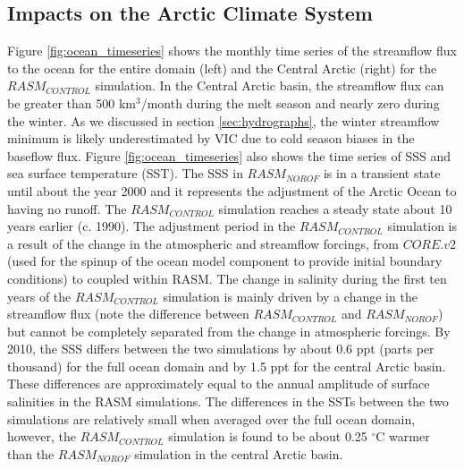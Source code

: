 \documentclass[jgrga, draft]{agutex}
\begin{document}
\begin{article}
\subsection{Impacts on the Arctic Climate System}
\label{sec:ocean}
Figure \ref{fig:ocean_timeseries} shows the monthly time series of the streamflow flux to the ocean for the entire domain (left) and the Central Arctic (right) for the $RASM_{CONTROL}$ simulation.
In the Central Arctic basin, the streamflow flux can be greater than 500 km$^3$/month during the melt season and nearly zero during the winter.
As we discussed in section \ref{sec:hydrographs}, the winter streamflow minimum is likely underestimated by VIC due to cold season biases in the baseflow flux.
Figure \ref{fig:ocean_timeseries} also shows the time series of SSS and sea surface temperature (SST).
The SSS in $RASM_{NOROF}$ is in a transient state until about the year 2000 and it represents the adjustment of the Arctic Ocean to having no runoff.
The $RASM_{CONTROL}$ simulation reaches a steady state about 10 years earlier (c. 1990).
The adjustment period in the $RASM_{CONTROL}$ simulation is a result of the change in the atmospheric and streamflow forcings, from $CORE.v2$ (used for the spinup of the ocean model component to provide initial boundary conditions) to coupled within RASM.
The change in salinity during the first ten years of the $RASM_{CONTROL}$ simulation is mainly driven by a change in the streamflow flux (note the difference between $RASM_{CONTROL}$ and $RASM_{NOROF}$) but cannot be completely separated from the change in atmospheric forcings.
By 2010, the SSS differs between the two simulations by about 0.6 ppt (parts per thousand) for the full ocean domain and by 1.5 ppt for the central Arctic basin.
These differences are approximately equal to the annual amplitude of surface salinities in the RASM simulations.
The differences in the SSTs between the two simulations are relatively small when averaged over the full ocean domain, however, the $RASM_{CONTROL}$ simulation is found to be about 0.25 $^{\circ}$C warmer than the $RASM_{NOROF}$ simulation in the central Arctic basin.


\end{article}
\end{document}
